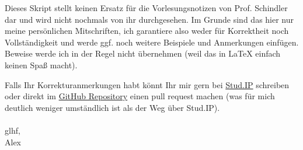 \documentclass{jvfscript-de}
\newcounter{file}
\begin{document}
\frontmatter
	\maketitle
	\begingroup
	\let\clearpage\relax
	\tableofcontents
	\listoflectures
	\listoffiles
	\endgroup
\newpage
\thispagestyle{plain}

Dieses Skript stellt keinen Ersatz für die Vorlesungsnotizen von Prof. Schindler dar und wird nicht nochmals von ihr durchgesehen. Im Grunde sind das hier nur meine persönlichen Mitschriften, ich garantiere also weder für Korrektheit noch Vollständigkeit und werde ggf. noch weitere Beispiele und Anmerkungen einfügen. Beweise werde ich in der Regel nicht übernehmen (weil das in \LaTeX{} einfach keinen Spaß macht).

Falls Ihr Korrekturanmerkungen habt könnt Ihr mir gern bei \href{https://studip-ecampus.uni-goettingen.de/dispatch.php/profile?username=n.sennewald}{Stud.IP} schreiben oder direkt im \href{https://github.com/vonfalkenstein/Vorlesungsmitschrift-Zahlentheorie}{GitHub Repository} einen pull request machen (was für mich deutlich weniger umständlich ist als der Weg über Stud.IP).\\\\
glhf,\\
Alex


\mainmatter
	
	
	
	
	
	
	
	
	
	\pagestyle{plain}
	\printindex
\end{document}
